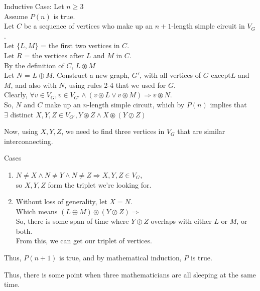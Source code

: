 \documentclass[fleqn]{article}
\begin{document}
Inductive Case: Let $n \geq 3$\\
Assume $P(n)$ is true.\\
Let $C$ be a sequence of vertices who make up an $n+1$-length simple circuit in $V_G$.\\
Let $\lbrace L,M \rbrace$ = the first two vertices in $C$.\\
Let $R$ = the vertices after $L$ and $M$ in $C$.\\
By the definition of $C$, $L \circledast M$\\
Let $N$ = $L \oplus M$.
Construct a new graph, $G'$, with all vertices of $G$ except$L$ and $M$, and also with $N$, using rules 2-4 that we used for $G$.\\
Clearly, $\forall v \in V_G, v \in V_{G'} \wedge 
                             (v \circledast L \vee v \circledast M)
          \Rightarrow v \circledast N$.\\
So, $N$ and $C$ make up an $n$-length simple circuit, which by $P(n)$ implies that\\
$\exists$ distinct $X,Y,Z \in V_{G'},
              Y \circledast Z \wedge
              X \circledast (Y \oslash Z)$

Now, using $X,Y,Z$, we need to find three vertices in $V_G$ that are similar interconnecting.

Cases
\begin{enumerate}
  \item $N \not= X \wedge N \not= Y \wedge N \not= Z \Rightarrow
        X,Y,Z \in V_G$,\\
        so $X,Y,Z$ form the triplet we're looking for.

  \item Without loss of generality, let $X = N$.\\
        Which means $(L \oplus M) \circledast (Y \oslash Z) \Rightarrow$\\
        So, there is some span of time where $Y \oslash Z$ overlaps
        with either $L$ or $M$, or both.\\
        From this, we can get our triplet of vertices.
\end{enumerate}
Thus, $P(n+1)$ is true, and by mathematical induction, $P$ is true.

Thus, there is some point when three mathematicians are all sleeping at the same time.
\end{document}
